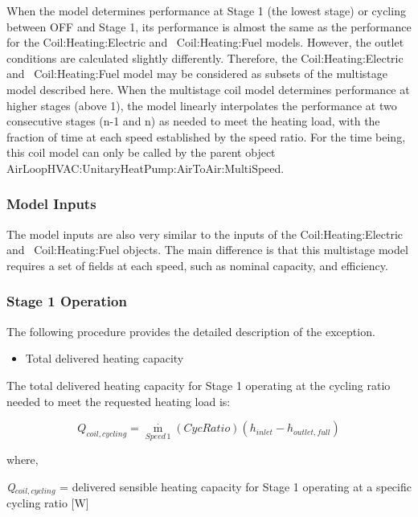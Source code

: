 When the model determines performance at Stage 1 (the lowest stage) or cycling between OFF and Stage 1, its performance is almost the same as the performance for the Coil:Heating:Electric and~ Coil:Heating:Fuel models. However, the outlet conditions are calculated slightly differently. Therefore, the Coil:Heating:Electric and~ Coil:Heating:Fuel model may be considered as subsets of the multistage model described here. When the multistage coil model determines performance at higher stages (above 1), the model linearly interpolates the performance at two consecutive stages (n-1 and n) as needed to meet the heating load, with the fraction of time at each speed established by the speed ratio. For the time being, this coil model can only be called by the parent object AirLoopHVAC:UnitaryHeatPump:AirToAir:MultiSpeed.

\subsubsection{Model Inputs}\label{model-inputs-1}

The model inputs are also very similar to the inputs of the Coil:Heating:Electric and~ Coil:Heating:Fuel objects. The main difference is that this multistage model requires a set of fields at each speed, such as nominal capacity, and efficiency.

\subsubsection{Stage 1 Operation}\label{stage-1-operation}

The following procedure provides the detailed description of the exception.

\begin{itemize}
  \item Total delivered heating capacity
\end{itemize}

The total delivered heating capacity for Stage 1 operating at the cycling ratio needed to meet the requested heating load is:

\begin{equation}
  Q_{coil,cycling} = {\mathop m\limits^\cdot_{Speed\,1}} \left( CycRatio \right) (h_{inlet} - h_{outlet,full})
\end{equation}

where,

\emph{Q\(_{coil,cycling}\)} = delivered sensible heating capacity for Stage 1 operating at a specific cycling ratio {[}W{]}

